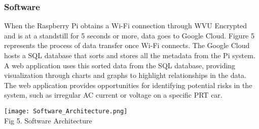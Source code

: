 \subsubsection{Software}
When the Raspberry Pi obtains a Wi-Fi connection through WVU Encrypted and is at a standstill for 5 seconds or more, data goes to Google Cloud. 
Figure 5 represents the process of data transfer once Wi-Fi connects. 
The Google Cloud hosts a SQL database that sorts and stores all the metadata from the Pi system. 
A web application uses this sorted data from the SQL database, providing visualization through charts and graphs to highlight relationships in the data. 
The web application provides opportunities for identifying potential risks in the system, such as irregular AC current or voltage on a specific PRT car.

\begin{center}
    \texttt{[image: Software\_Architecture.png]}\\
    Fig 5. Software Architecture
\end{center}
